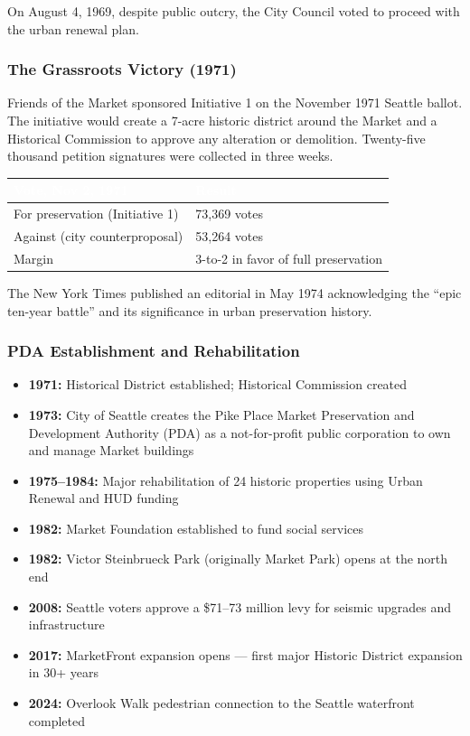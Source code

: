 \documentclass[11pt,letterpaper]{article}
\newcommand{\tableheader}[1]{\textbf{\sffamily\textcolor{white}{#1}}}
\begin{document}
On August 4, 1969, despite public outcry, the City Council voted to proceed with the urban renewal plan.

\subsubsection{The Grassroots Victory (1971)}

Friends of the Market sponsored Initiative 1 on the November 1971 Seattle ballot. The initiative would create a 7-acre historic district around the Market and a Historical Commission to approve any alteration or demolition. Twenty-five thousand petition signatures were collected in three weeks.

\begin{center}
\begin{tabularx}{\textwidth}{L{4cm}X}
\toprule
{}
\tableheader{Vote, Nov 2, 1971} & \tableheader{Result} \\
\midrule
For preservation (Initiative 1) & 73,369 votes \\
Against (city counterproposal) & 53,264 votes \\
Margin & 3-to-2 in favor of full preservation \\
\bottomrule
\end{tabularx}
\end{center}

The New York Times published an editorial in May 1974 acknowledging the ``epic ten-year battle'' and its significance in urban preservation history.

\subsubsection{PDA Establishment and Rehabilitation}

\begin{itemize}[noitemsep]
  \item \textbf{1971:} Historical District established; Historical Commission created
  \item \textbf{1973:} City of Seattle creates the Pike Place Market Preservation and Development Authority (PDA) as a not-for-profit public corporation to own and manage Market buildings
  \item \textbf{1975--1984:} Major rehabilitation of 24 historic properties using Urban Renewal and HUD funding
  \item \textbf{1982:} Market Foundation established to fund social services
  \item \textbf{1982:} Victor Steinbrueck Park (originally Market Park) opens at the north end
  \item \textbf{2008:} Seattle voters approve a \$71--73 million levy for seismic upgrades and infrastructure
  \item \textbf{2017:} MarketFront expansion opens --- first major Historic District expansion in 30+ years
  \item \textbf{2024:} Overlook Walk pedestrian connection to the Seattle waterfront completed
\end{itemize}
\end{document}

